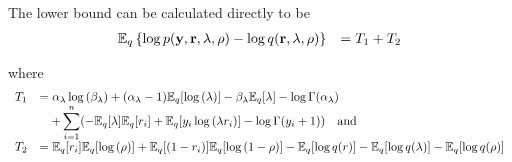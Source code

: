 \documentclass[11pt]{amsart}
\begin{document}
The lower bound can be calculated directly to be
$$
\begin{array}{rl}
	{\mathbb E}_q \left\{ \log{p({\bf y}, {\bf r}, \lambda, \rho)} - \log{q({\bf r}, \lambda, \rho)} \right\} & = T_1 + T_2 \\
\end{array}
$$

\noindent where
$$
\begin{array}{rl}
	T_1 & \displaystyle =                                                                                                                          
	\alpha_\lambda \log{(\beta_\lambda)} + (\alpha_\lambda - 1) {\mathbb E}_q[\log{(\lambda)}] - \beta_\lambda {\mathbb E}_q [\lambda] - \log\Gamma(\alpha_\lambda) \\
	    & \displaystyle \quad + \sum_{i=1}^n ( -{\mathbb E}_q [\lambda] {\mathbb E}_q [r_i] + {\mathbb E}_q[y_i \log{(\lambda r_i)}] - \log\Gamma(y_i+1)) \quad \mbox{and} 
	\\ [1ex]
	T_2 & ={\mathbb E}_q[r_i] {\mathbb E}_q[\log{(\rho)}] + {\mathbb E}_q[(1 - r_i)] {\mathbb E}_q[\log{(1 - \rho)}]                                                     
	- {\mathbb E}_q[\log{q(r)}] 
	- {\mathbb E}_q[\log{q(\lambda)}] 
	- {\mathbb E}_q[ \log{q(\rho)}]
\end{array}
$$
\end{document}
